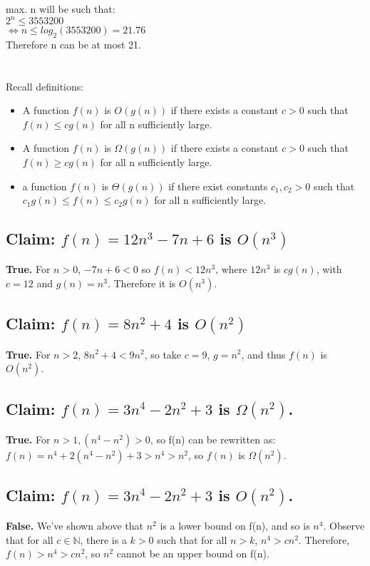 \documentclass[tikz]{article}
\begin{document}
max. n will be such that:\\
$2^n \leq 3553200$\\
$\iff n \leq log_2(3553200) = 21.76$\\
Therefore n can be at most 21.

\section{}
Recall definitions:
\begin{itemize}
	\item A function $f(n)$ is $O(g(n))$ if there exists a constant $c>0$ such that $f(n) \leq cg(n)$ for all n sufficiently large.
	\item A function $f(n)$ is $\Omega(g(n))$ if there exists a constant $c>0$ such that $f(n)\geq cg(n)$ for all n sufficiently large.
	\item a function $f(n)$ is $\Theta(g(n))$ if there exist constants $c_1, c_2 >0$ such that $c_1 g(n) \leq f(n) \leq c_2 g(n)$ for all n sufficiently large.
\end{itemize}

\subsection{Claim: $f(n) = 12n^3 - 7n +6$ is $O(n^3)$}
\textbf{True.} For $ n>0$, $-7n+6 < 0$ so $f(n) < 12n^3$, where $12n^3$ is $cg(n)$, with $c = 12$ and $g(n) = n^3$. Therefore it is $O(n^3)$.
\subsection{Claim: $f(n) = 8n^2 + 4$ is $O(n^2)$}
\textbf{True.} For $n>2$, $8n^2 + 4< 9n^2$, so take $c = 9$, $g = n^2$, and thus $f(n)$ is $O(n^2)$.
\subsection{Claim: $f(n) = 3n^4 - 2n^2 +3$ is $\Omega(n^2)$.}
\textbf{True.} For $n>1, (n^4 - n^2) > 0$, so f(n) can be rewritten as: $f(n) = n^4 + 2(n^4 - n^2) + 3 > n^4 > n^2$, so $f(n)$ is $\Omega(n^2)$.
\subsection{Claim: $f(n) = 3n^4 - 2n^2 +3$ is $O(n^2)$.}
\textbf{False.} We've shown above that $n^2$ is a lower bound on f(n), and so is $n^4$. Observe that for all $c \in \mathbb{N}$, there is a $k >0$ such that for all $n > k$, $n^4 > cn^2$. Therefore, $f(n) > n^4 > cn^2$, so $n^2$ cannot be an upper bound on f(n).
\end{document}
